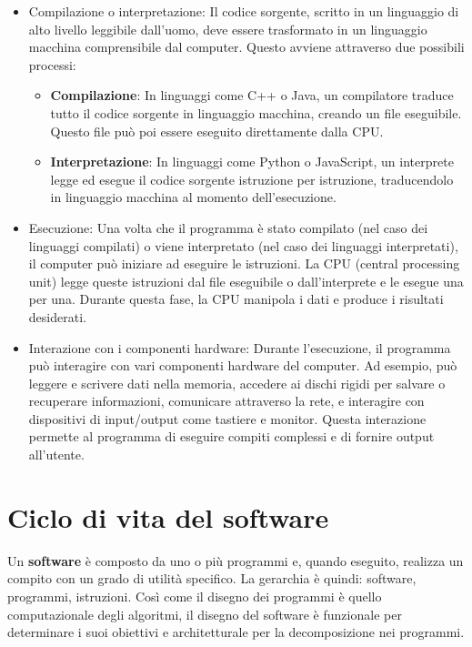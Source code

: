 \documentclass[
  letterpaper,
]{scrbook}
\begin{document}
\begin{itemize}
\item
  Compilazione o interpretazione: Il codice sorgente, scritto in un
  linguaggio di alto livello leggibile dall'uomo, deve essere
  trasformato in un linguaggio macchina comprensibile dal computer.
  Questo avviene attraverso due possibili processi:

  \begin{itemize}
  \item
    \textbf{Compilazione}: In linguaggi come C++ o Java, un compilatore
    traduce tutto il codice sorgente in linguaggio macchina, creando un
    file eseguibile. Questo file può poi essere eseguito direttamente
    dalla CPU.
  \item
    \textbf{Interpretazione}: In linguaggi come Python o JavaScript, un
    interprete legge ed esegue il codice sorgente istruzione per
    istruzione, traducendolo in linguaggio macchina al momento
    dell'esecuzione.
  \end{itemize}
\item
  Esecuzione: Una volta che il programma è stato compilato (nel caso dei
  linguaggi compilati) o viene interpretato (nel caso dei linguaggi
  interpretati), il computer può iniziare ad eseguire le istruzioni. La
  CPU (central processing unit) legge queste istruzioni dal file
  eseguibile o dall'interprete e le esegue una per una. Durante questa
  fase, la CPU manipola i dati e produce i risultati desiderati.
\item
  Interazione con i componenti hardware: Durante l'esecuzione, il
  programma può interagire con vari componenti hardware del computer. Ad
  esempio, può leggere e scrivere dati nella memoria, accedere ai dischi
  rigidi per salvare o recuperare informazioni, comunicare attraverso la
  rete, e interagire con dispositivi di input/output come tastiere e
  monitor. Questa interazione permette al programma di eseguire compiti
  complessi e di fornire output all'utente.
\end{itemize}

\section{Ciclo di vita del software}\label{ciclo-di-vita-del-software}

Un \textbf{software} è composto da uno o più programmi e, quando
eseguito, realizza un compito con un grado di utilità specifico. La
gerarchia è quindi: software, programmi, istruzioni. Così come il
disegno dei programmi è quello computazionale degli algoritmi, il
disegno del software è funzionale per determinare i suoi obiettivi e
architetturale per la decomposizione nei programmi.
\end{document}

